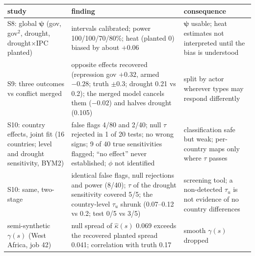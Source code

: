 \documentclass[10pt]{article}
\begin{document}
{\footnotesize\setlength{\tabcolsep}{4pt}\begin{tabular}{@{}p{}p{}p{}@{}}
\toprule
study & finding & consequence \\
\midrule
S8: global $\bm\psi$ (gov, gov$^2$, drought, drought$\times$IPC planted) & intervals calibrated; power 100/100/70/80\%; heat (planted 0) biased by about $+0.06$ & $\bm\psi$ usable; heat estimates not interpreted until the bias is understood \\
S9: three outcomes vs conflict merged & opposite effects recovered (repression gov $+0.32$, armed $-0.28$; truth $\pm0.3$; drought 0.21 vs 0.2); the merged model cancels them ($-0.02$) and halves drought (0.105) & split by actor wherever types may respond differently \\
S10: country effects, joint fit (16 countries; level and drought sensitivity, BYM2) & false flags 4/80 and 2/40; null $\tau$ rejected in 1 of 20 tests; no wrong signs; 9 of 40 true sensitivities flagged; ``no effect'' never established; $\phi$ not identified & classification safe but weak; per-country maps only where $\tau$ passes \\
S10: same, two-stage & identical false flags, null rejections and power (8/40); $\tau$ of the drought sensitivity covered 5/5; the country-level $\tau_u$ shrunk (0.07--0.12 vs 0.2; test 0/5 vs 3/5) & screening tool; a non-detected $\tau_u$ is not evidence of no country differences \\
semi-synthetic $\gamma(s)$ (West Africa, job 42) & null spread of $\hat\kappa(s)$ 0.069 exceeds the recovered planted spread 0.041; correlation with truth 0.17 & smooth $\gamma(s)$ dropped \\
\bottomrule
\end{tabular}}
\end{document}
